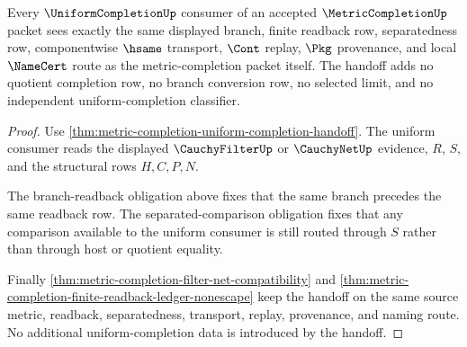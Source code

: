 \begin{theorem}
\label{thm:metric-completion-obligation-uniform-handoff}
Every $\UniformCompletionUp$ consumer of an accepted $\MetricCompletionUp$ packet sees exactly the same displayed branch, finite readback row, separatedness row, componentwise $\hsame$ transport, $\Cont$ replay, $\Pkg$ provenance, and local $\NameCert$ route as the metric-completion packet itself. The handoff adds no quotient completion row, no branch conversion row, no selected limit, and no independent uniform-completion classifier.
\end{theorem}
\begin{proof}
Use \autoref{thm:metric-completion-uniform-completion-handoff}. The uniform consumer reads the displayed $\CauchyFilterUp$ or $\CauchyNetUp$ evidence, $R$, $S$, and the structural rows $H,C,P,N$.

The branch-readback obligation above fixes that the same branch precedes the same readback row. The separated-comparison obligation fixes that any comparison available to the uniform consumer is still routed through $S$ rather than through host or quotient equality.

Finally \autoref{thm:metric-completion-filter-net-compatibility} and \autoref{thm:metric-completion-finite-readback-ledger-nonescape} keep the handoff on the same source metric, readback, separatedness, transport, replay, provenance, and naming route. No additional uniform-completion data is introduced by the handoff.
\end{proof}


